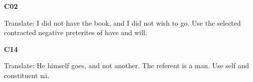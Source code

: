 \par\begin{minipage}{\linewidth}\raggedright
\textbf{C02}

Translate: I did not have the book, and I did not wish to go. Use the selected contracted negative preterites of have and will.

\end{minipage}\par\addvspace{4pt}

\par\begin{minipage}{\linewidth}\raggedright
\textbf{C14}

Translate: He himself goes, and not another. The referent is a man. Use self and constituent nā.

\end{minipage}\par\addvspace{4pt}

